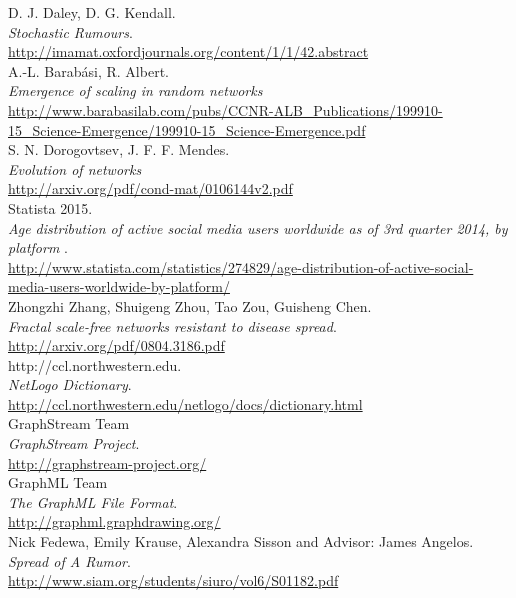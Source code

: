 \newpage
\begin{thebibliography}{5}


D. J. Daley, D. G. Kendall.\\
\emph{Stochastic Rumours}.\\
\url{http://imamat.oxfordjournals.org/content/1/1/42.abstract}\\

A.-L. Barabási, R. Albert.\\
\emph{Emergence of scaling in random networks}\\
\url{http://www.barabasilab.com/pubs/CCNR-ALB_Publications/199910-15_Science-Emergence/199910-15_Science-Emergence.pdf}\\

S. N. Dorogovtsev, J. F. F. Mendes.\\
\emph{Evolution of networks}\\
\url{http://arxiv.org/pdf/cond-mat/0106144v2.pdf}\\

Statista 2015.\\
\emph{Age distribution of active social media users worldwide as of 3rd quarter 2014, by platform }.\\
\url{http://www.statista.com/statistics/274829/age-distribution-of-active-social-media-users-worldwide-by-platform/}\\

Zhongzhi Zhang, Shuigeng Zhou, Tao Zou, Guisheng Chen.\\
\emph{Fractal scale-free networks resistant to disease spread}.\\
\url{http://arxiv.org/pdf/0804.3186.pdf}\\

http://ccl.northwestern.edu.\\
\emph{NetLogo Dictionary}.\\
\url{http://ccl.northwestern.edu/netlogo/docs/dictionary.html}\\

GraphStream Team\\
\emph{GraphStream Project}.\\
\url{http://graphstream-project.org/}\\

GraphML Team\\
\emph{The GraphML File Format}.\\
\url{http://graphml.graphdrawing.org/}\\

Nick Fedewa, Emily Krause, Alexandra Sisson and Advisor: James Angelos.\\
\emph{Spread of A Rumor}.\\
\url{http://www.siam.org/students/siuro/vol6/S01182.pdf}\\


\end{thebibliography}